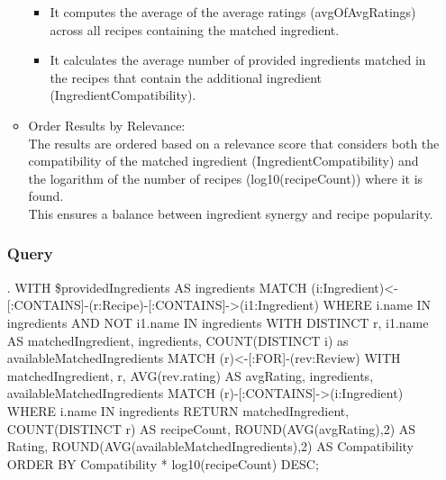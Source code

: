 \begin{enumerate}
\begin{itemize}
\begin{itemize}
        \item It computes the average of the average ratings (avgOfAvgRatings) across all recipes containing the matched ingredient.
        \item It calculates the average number of provided ingredients matched in the recipes that contain the additional ingredient (IngredientCompatibility).
    \end{itemize}
    \item Order Results by Relevance:\\
    The results are ordered based on a relevance score that considers both the compatibility of the matched ingredient (IngredientCompatibility) and the logarithm of the number of recipes (log10(recipeCount)) where it is found. \\This ensures a balance between ingredient synergy and recipe popularity.
\end{itemize}

\subsubsection{Query}
\begin{CypherQuery}
    .
    WITH \$providedIngredients AS ingredients
    MATCH 
    (i:Ingredient)<-[:CONTAINS]-(r:Recipe)-[:CONTAINS]->(i1:Ingredient)
    WHERE i.name IN ingredients AND NOT i1.name IN ingredients
    WITH DISTINCT r, i1.name AS matchedIngredient, ingredients, 
    COUNT(DISTINCT i) as availableMatchedIngredients
    MATCH (r)<-[:FOR]-(rev:Review)
    WITH matchedIngredient, r, AVG(rev.rating) AS avgRating, ingredients, 
    availableMatchedIngredients
    MATCH (r)-[:CONTAINS]->(i:Ingredient)
    WHERE i.name IN ingredients
    RETURN matchedIngredient, COUNT(DISTINCT r) AS recipeCount, 
    ROUND(AVG(avgRating),2) AS Rating, 
    ROUND(AVG(availableMatchedIngredients),2) AS Compatibility
    ORDER BY Compatibility * log10(recipeCount) DESC;
\end{CypherQuery}
    

\end{enumerate}

